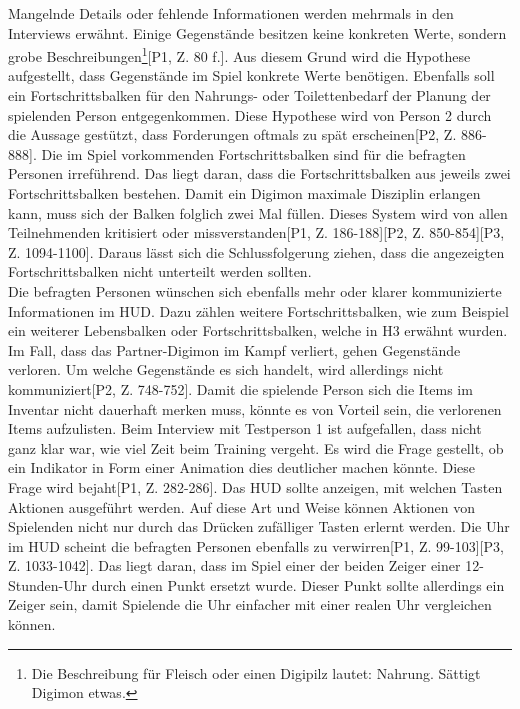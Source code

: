 Mangelnde Details oder fehlende Informationen werden mehrmals in den Interviews erwähnt. Einige Gegenstände besitzen keine konkreten Werte, sondern grobe Beschreibungen\footnote{Die Beschreibung für Fleisch oder einen Digipilz lautet: \glqq Nahrung. Sättigt Digimon etwas.\grqq}[P1, Z. 80 f.]. Aus diesem Grund wird die Hypothese aufgestellt, dass Gegenstände im Spiel konkrete Werte benötigen\hypothesis[P1, Z. 143 f.][P3, Z. 1315 f.]. Ebenfalls soll ein Fortschrittsbalken für den Nahrungs- oder Toilettenbedarf der Planung der spielenden Person entgegenkommen\hypothesis[P1, Z. 230 f.]. Diese Hypothese wird von Person 2 durch die Aussage gestützt, dass Forderungen oftmals zu spät erscheinen[P2, Z. 886-888]. Die im Spiel vorkommenden Fortschrittsbalken sind für die befragten Personen irreführend. Das liegt daran, dass die Fortschrittsbalken aus jeweils zwei Fortschrittsbalken bestehen. Damit ein Digimon maximale Disziplin erlangen kann, muss sich der Balken folglich zwei Mal füllen. Dieses System wird von allen Teilnehmenden kritisiert oder missverstanden[P1, Z. 186-188][P2, Z. 850-854][P3, Z. 1094-1100]. Daraus lässt sich die Schlussfolgerung ziehen, dass die angezeigten Fortschrittsbalken nicht unterteilt werden sollten\hypothesis. \\

Die befragten Personen wünschen sich ebenfalls mehr oder klarer kommunizierte Informationen im \ac{HUD}. Dazu zählen weitere Fortschrittsbalken, wie zum Beispiel ein weiterer Lebensbalken oder Fortschrittsbalken, welche in H3 erwähnt wurden\hypothesis[P2, Z. 750-754][P3, Z. 1160-1173][P3, Z. 1245-125]. Im Fall, dass das Partner-Digimon im Kampf verliert, gehen Gegenstände verloren. Um welche Gegenstände es sich handelt, wird allerdings nicht kommuniziert[P2, Z. 748-752]. Damit die spielende Person sich die Items im Inventar nicht dauerhaft merken muss, könnte es von Vorteil sein, die verlorenen Items aufzulisten\hypothesis. Beim Interview mit Testperson 1 ist aufgefallen, dass nicht ganz klar war, wie viel Zeit beim Training vergeht. Es wird die Frage gestellt, ob ein Indikator in Form einer Animation dies deutlicher machen könnte\hypothesis. Diese Frage wird bejaht[P1, Z. 282-286]. Das \ac{HUD} sollte anzeigen, mit welchen Tasten Aktionen ausgeführt werden. Auf diese Art und Weise können Aktionen von Spielenden nicht nur durch das Drücken zufälliger Tasten erlernt werden\hypothesis[P1, Z. 59-62][P3, Z. 1000-1009][P3, Z. 1113-1116]. Die Uhr im \ac{HUD} scheint die befragten Personen ebenfalls zu verwirren[P1, Z. 99-103][P3, Z. 1033-1042]. Das liegt daran, dass im Spiel einer der beiden Zeiger einer 12-Stunden-Uhr durch einen Punkt ersetzt wurde. Dieser Punkt sollte allerdings ein Zeiger sein, damit Spielende die Uhr einfacher mit einer realen Uhr vergleichen können\hypothesis.\\

